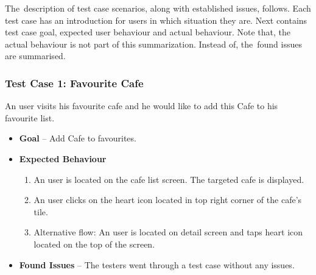 The~description of test case scenarios, along with established issues, follows. Each test case has an introduction for users in which situation they are. Next contains test case goal, expected user behaviour and actual behaviour. Note that, the actual behaviour is not part of this summarization. Instead of, the~found issues are summarised. 
\subsubsection{Test Case 1: Favourite Cafe}
An user visits his favourite cafe and he would like to add this Cafe to his favourite list. 
\begin{itemize}
    \item \textbf{Goal} -- Add Cafe to favourites.
    \item \textbf{Expected Behaviour}
    \begin{enumerate}
        \item An user is located on the cafe list screen. The targeted cafe is displayed.
        \item An user clicks on the heart icon located in top right corner of the cafe's tile. 
        \item Alternative flow: An user is located on detail screen and taps heart icon located on the top of the screen. 
    \end{enumerate}
    \item \textbf{Found Issues} -- The testers went through a test case without any issues.
\end{itemize}
